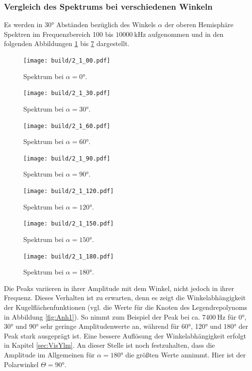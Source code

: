 \subsubsection{Vergleich des Spektrums bei verschiedenen Winkeln}
Es werden in 30° Abständen bezüglich des Winkels $\alpha$ der oberen Hemisphäre Spektren im Frequenzbereich 100 bis $\SI{10000}{\kilo\hertz}$ aufgenommen und in den folgenden Abbildungen \ref{fig:2_1} bis \ref{fig:2_7} dargestellt.
\begin{figure}
  \centering  \texttt{[image: build/2\_1\_00.pdf]}  \caption{Spektrum bei $\alpha=0$°.} \label{fig:2_1}
\end{figure}
\begin{figure}
  \centering  \texttt{[image: build/2\_1\_30.pdf]}  \caption{Spektrum bei $\alpha=30$°.} \label{fig:2_2}
\end{figure}
\begin{figure}
  \centering  \texttt{[image: build/2\_1\_60.pdf]}  \caption{Spektrum bei $\alpha=60$°.} \label{fig:2_3}
\end{figure}
\begin{figure}
  \centering  \texttt{[image: build/2\_1\_90.pdf]}  \caption{Spektrum bei $\alpha=90$°.} \label{fig:2_4}
\end{figure}
\begin{figure}
  \centering  \texttt{[image: build/2\_1\_120.pdf]}  \caption{Spektrum bei $\alpha=120$°.} \label{fig:2_5}
\end{figure}
\begin{figure}
  \centering  \texttt{[image: build/2\_1\_150.pdf]}  \caption{Spektrum bei $\alpha=150$°.} \label{fig:2_6}
\end{figure}
\begin{figure}
  \centering  \texttt{[image: build/2\_1\_180.pdf]}  \caption{Spektrum bei $\alpha=180$°.} \label{fig:2_7}
\end{figure}
Die Peaks variieren in ihrer Amplitude mit dem Winkel, nicht jedoch in ihrer Frequenz. Dieses Verhalten ist zu erwarten, denn es zeigt die Winkelabhängigkeit der Kugelflächenfunktionen (vgl. die Werte für die Knoten des Legendrepolynoms in Abbildung \ref{fig:Anh1}). So nimmt zum Beispiel der Peak bei ca. $\SI{7400}{\hertz}$ für 0°, 30° und 90° sehr geringe Amplitudenwerte an, während für 60°, 120° und 180° der Peak stark ausgeprägt ist. Eine bessere Auflösung der Winkelabhängigkeit erfolgt in Kapitel \ref{sec:VisYlm}. An dieser Stelle ist noch festzuhalten, dass die Amplitude im Allgemeinen für $\alpha=180$° die größten Werte annimmt. Hier ist der Polarwinkel $\Theta=90$°.

